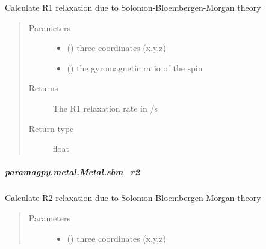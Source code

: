 \documentclass[a4paper,10pt,english]{sphinxmanual}
\begin{document}
\begin{fulllineitems}
\begin{fulllineitems}
\begin{fulllineitems}
\label{\detokenize{reference/generated/paramagpy.metal.Metal.sbm_r1:paramagpy.metal.Metal.sbm_r1}}
Calculate R1 relaxation due to Solomon-Bloembergen-Morgan theory
\begin{quote}\begin{description}
\item[{Parameters}] \leavevmode\begin{itemize}
\item {} 
 () \textendash{} three coordinates (x,y,z)

\item {} 
 () \textendash{} the gyromagnetic ratio of the spin

\end{itemize}

\item[{Returns}] \leavevmode
{} \textendash{} The R1 relaxation rate in /s

\item[{Return type}] \leavevmode
float

\end{description}\end{quote}

\end{fulllineitems}



\subparagraph{paramagpy.metal.Metal.sbm\_r2}
\label{\detokenize{reference/generated/paramagpy.metal.Metal.sbm_r2:paramagpy-metal-metal-sbm-r2}}\label{\detokenize{reference/generated/paramagpy.metal.Metal.sbm_r2::doc}}

\begin{fulllineitems}
\label{\detokenize{reference/generated/paramagpy.metal.Metal.sbm_r2:paramagpy.metal.Metal.sbm_r2}}
Calculate R2 relaxation due to Solomon-Bloembergen-Morgan theory
\begin{quote}\begin{description}
\item[{Parameters}] \leavevmode\begin{itemize}
\item {} 
 () \textendash{} three coordinates (x,y,z)


\end{itemize}
\end{description}
\end{quote}
\end{fulllineitems}
\end{fulllineitems}
\end{fulllineitems}
\end{document}
